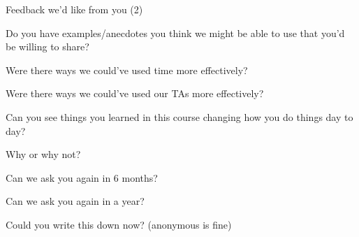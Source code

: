 \documentclass[12pt,t]{beamer}
\begin{document}
\begin{frame}[c]{Feedback we'd like from you (2)}

  \bi
\item Do you have examples/anecdotes you think we might be able to use
  that you'd be willing to share?
\item Were there ways we could've used time more effectively?
\item Were there ways we could've used our TAs more effectively?
  \item Can you see things you learned in this course changing how you
    do things day to day?
    \bi
  \item Why or why not?
  \item Can we ask you again in 6 months?
  \item Can we ask you again in a year?
    \ei

 \item Could you write this down now? (anonymous is fine)
    \ei

  \note{}


\end{frame}
\end{document}
